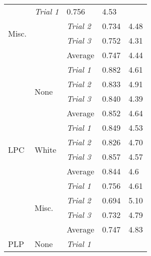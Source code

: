 \begin{longtable}{@{}lllll@{}}
      \multicolumn{1}{l|}{\multirow{4}{*}{Misc.}} &
      \textit{Trial 1} &
      0.756 &
      4.53 \\
    \multicolumn{1}{l|}{} &
      \multicolumn{1}{l|}{} &
      \textit{Trial 2} &
      0.734 &
      4.48 \\
    \multicolumn{1}{l|}{} &
      \multicolumn{1}{l|}{} &
      \textit{Trial 3} &
      0.752 &
      4.31 \\
    \multicolumn{1}{l|}{} &
      \multicolumn{1}{l|}{} &
      Average &
      0.747 &
      4.44 \\* \midrule
    \multicolumn{1}{l|}{\multirow{12}{*}{LPC}} &
      \multicolumn{1}{l|}{\multirow{4}{*}{None}} &
      \textit{Trial 1} &
      0.882 &
      4.61 \\
    \multicolumn{1}{l|}{} &
      \multicolumn{1}{l|}{} &
      \textit{Trial 2} &
      0.833 &
      4.91 \\
    \multicolumn{1}{l|}{} &
      \multicolumn{1}{l|}{} &
      \textit{Trial 3} &
      0.840 &
      4.39 \\
    \multicolumn{1}{l|}{} &
      \multicolumn{1}{l|}{} &
      Average &
      0.852 &
      4.64 \\
    \multicolumn{1}{l|}{} &
      \multicolumn{1}{l|}{\multirow{4}{*}{White}} &
      \textit{Trial 1} &
      0.849 &
      4.53 \\
    \multicolumn{1}{l|}{} &
      \multicolumn{1}{l|}{} &
      \textit{Trial 2} &
      0.826 &
      4.70 \\
    \multicolumn{1}{l|}{} &
      \multicolumn{1}{l|}{} &
      \textit{Trial 3} &
      0.857 &
      4.57 \\
    \multicolumn{1}{l|}{} &
      \multicolumn{1}{l|}{} &
      Average &
      0.844 &
      4.6 \\
    \multicolumn{1}{l|}{} &
      \multicolumn{1}{l|}{\multirow{4}{*}{Misc.}} &
      \textit{Trial 1} &
      0.756 &
      4.61 \\
    \multicolumn{1}{l|}{} &
      \multicolumn{1}{l|}{} &
      \textit{Trial 2} &
      0.694 &
      5.10 \\
    \multicolumn{1}{l|}{} &
      \multicolumn{1}{l|}{} &
      \textit{Trial 3} &
      0.732 &
      4.79 \\
    \multicolumn{1}{l|}{} &
      \multicolumn{1}{l|}{} &
      Average &
      0.747 &
      4.83 \\* \midrule
    \multicolumn{1}{l|}{\multirow{12}{*}{PLP}} &
      \multicolumn{1}{l|}{\multirow{4}{*}{None}} &
      \textit{Trial 1} &

\end{longtable}

